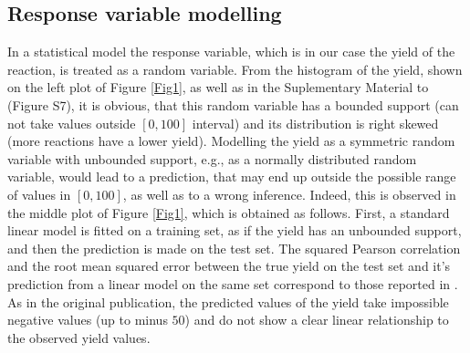 \documentclass[12pt]{article}
\begin{document}
\subsection{Response variable modelling}
\label{subsec:response}
In a statistical model the response variable, which is in our case the yield of the reaction, is treated as a random variable. From the histogram of the yield, shown on the left plot of Figure \ref{Fig1}, as well as in the Suplementary Material to \citet{Ahneman2018} (Figure S7), it is obvious, that this random variable has a bounded support (can not take values outside $[0,100]$ interval) and its distribution is right skewed (more reactions have a lower yield). Modelling the yield as a symmetric random variable with unbounded support, e.g., as a normally distributed random variable, would lead to a prediction, that may end up outside the possible range of values in $[0,100]$, as well as to a wrong inference. 
Indeed, this is observed in the middle plot of Figure \ref{Fig1}, which is obtained as follows. First, a standard linear model is fitted on a training set, as if the yield has an unbounded support, and then the prediction is made on the test set. The squared Pearson correlation and the root mean squared error between the true yield on the test set and it's prediction from a linear model on the same set correspond to those reported in \citet{Ahneman2018}. As in the original publication, the predicted values of the yield take impossible negative values (up to minus $50$) and do not show a clear linear relationship to the observed yield values. 
\end{document}
